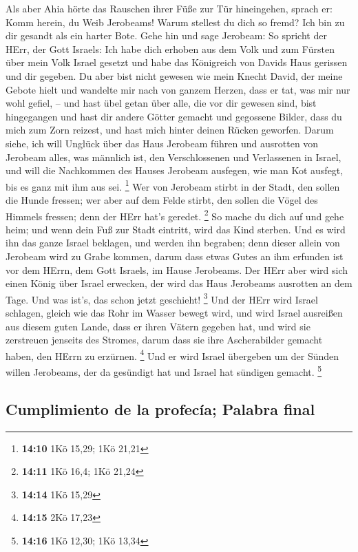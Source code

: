  Als aber Ahia hörte das Rauschen ihrer Füße zur Tür
hineingehen, sprach er: Komm herein, du Weib Jerobeams! Warum stellest
du dich so fremd? Ich bin zu dir gesandt als ein harter Bote.
 Gehe hin und sage Jerobeam: So spricht der HErr, der Gott
Israels: Ich habe dich erhoben aus dem Volk und zum Fürsten über mein
Volk Israel gesetzt  und habe das Königreich von Davids
Haus gerissen und dir gegeben. Du aber bist nicht gewesen wie mein
Knecht David, der meine Gebote hielt und wandelte mir nach von ganzem
Herzen, dass er tat, was mir nur wohl gefiel, --  und hast
übel getan über alle, die vor dir gewesen sind, bist hingegangen und
hast dir andere Götter gemacht und gegossene Bilder, dass du mich zum
Zorn reizest, und hast mich hinter deinen Rücken geworfen.
 Darum siehe, ich will Unglück über das Haus Jerobeam
führen und ausrotten von Jerobeam alles, was männlich ist, den
Verschlossenen und Verlassenen in Israel, und will die Nachkommen des
Hauses Jerobeam ausfegen, wie man Kot ausfegt, bis es ganz mit ihm aus
sei. \footnote{\textbf{14:10} 1Kö 15,29; 1Kö 21,21}  Wer
von Jerobeam stirbt in der Stadt, den sollen die Hunde fressen; wer aber
auf dem Felde stirbt, den sollen die Vögel des Himmels fressen; denn der
HErr hat's geredet. \footnote{\textbf{14:11} 1Kö 16,4; 1Kö 21,24}
 So mache du dich auf und gehe heim; und wenn dein Fuß
zur Stadt eintritt, wird das Kind sterben.  Und es wird
ihn das ganze Israel beklagen, und werden ihn begraben; denn dieser
allein von Jerobeam wird zu Grabe kommen, darum dass etwas Gutes an ihm
erfunden ist vor dem HErrn, dem Gott Israels, im Hause Jerobeams.
 Der HErr aber wird sich einen König über Israel
erwecken, der wird das Haus Jerobeams ausrotten an dem Tage. Und was
ist's, das schon jetzt geschieht! \footnote{\textbf{14:14} 1Kö 15,29}
 Und der HErr wird Israel schlagen, gleich wie das Rohr
im Wasser bewegt wird, und wird Israel ausreißen aus diesem guten Lande,
dass er ihren Vätern gegeben hat, und wird sie zerstreuen jenseits des
Stromes, darum dass sie ihre Ascherabilder gemacht haben, den HErrn zu
erzürnen. \footnote{\textbf{14:15} 2Kö 17,23}  Und er
wird Israel übergeben um der Sünden willen Jerobeams, der da gesündigt
hat und Israel hat sündigen gemacht. \footnote{\textbf{14:16} 1Kö 12,30;
  1Kö 13,34}

\hypertarget{cumplimiento-de-la-profecuxeda-palabra-final}{%
\subsection{Cumplimiento de la profecía; Palabra
final}\label{cumplimiento-de-la-profecuxeda-palabra-final}}

